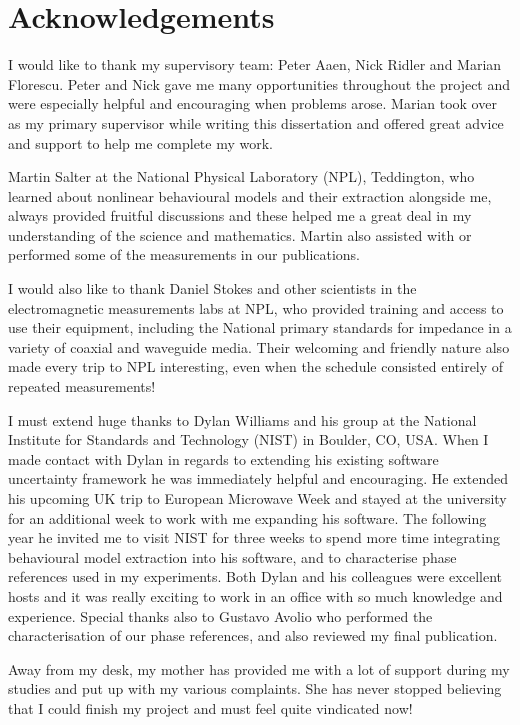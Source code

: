 \documentclass[../thesis/thesis.tex]{subfiles}
\begin{document}
\chapter*{Acknowledgements}
I would like to thank my supervisory team: Peter Aaen, Nick Ridler and Marian Florescu. Peter and Nick gave me many opportunities throughout the project and were especially helpful and encouraging when problems arose. Marian took over as my primary supervisor while writing this dissertation and offered great advice and support to help me complete my work.

Martin Salter at the National Physical Laboratory (NPL), Teddington, who learned about nonlinear behavioural models and their extraction alongside me, always provided fruitful discussions and these helped me a great deal in my understanding of the science and mathematics. Martin also assisted with or performed some of the measurements in our publications.

I would also like to thank Daniel Stokes and other scientists in the electromagnetic measurements labs at NPL, who provided training and access to use their equipment, including the National primary standards for impedance in a variety of coaxial and waveguide media. Their welcoming and friendly nature also made every trip to NPL interesting, even when the schedule consisted entirely of repeated measurements!

I must extend huge thanks to Dylan Williams and his group at the National Institute for Standards and Technology (NIST) in Boulder, CO, USA. When I made contact with Dylan in regards to extending his existing software uncertainty framework he was immediately helpful and encouraging. He extended his upcoming UK trip to European Microwave Week and stayed at the university for an additional week to work with me expanding his software. The following year he invited me to visit NIST for three weeks to spend more time integrating behavioural model extraction into his software, and to characterise phase references used in my experiments. Both Dylan and his colleagues were excellent hosts and it was really exciting to work in an office with so much knowledge and experience. Special thanks also to Gustavo Avolio who performed the characterisation of our phase references, and also reviewed my final publication.

Away from my desk, my mother has provided me with a lot of support during my studies and put up with my various complaints. She has never stopped believing that I could finish my project and must feel quite vindicated now!
\end{document}
